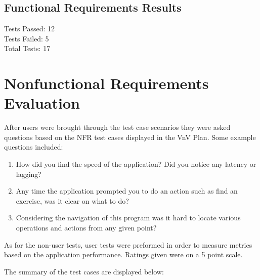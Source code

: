 \documentclass[12pt, titlepage]{article}
\begin{document}
\subsection{Functional Requirements Results}

Tests Passed: 12\\
Tests Failed: 5\\
Total Tests: 17\\

\section{Nonfunctional Requirements Evaluation}

\noindent After users were brought through the test case scenarios they were asked questions based on the NFR test cases displayed in the VnV Plan.
Some example questions included: \\
\begin{enumerate}
	\item How did you find the speed of the application? Did you notice any latency or lagging?
	\item Any time the application prompted you to do an action such as find an exercise, was it clear on what to do?
	\item Considering the navigation of this program was it hard to locate various operations and actions from any given point?
\end{enumerate}

\noindent As for the non-user tests, user tests were preformed in order to measure metrics based on the application performance.
Ratings given were on a 5 point scale.

\noindent The summary of the test cases are displayed below:
\end{document}
